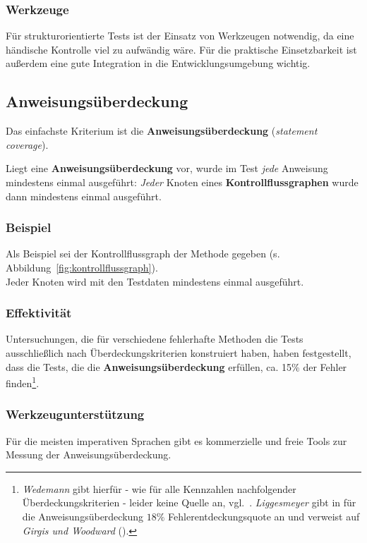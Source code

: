 \subsubsection*{Werkzeuge}
Für strukturorientierte Tests ist der Einsatz von Werkzeugen notwendig, da eine händische Kontrolle viel zu aufwändig wäre.
Für die praktische Einsetzbarkeit ist außerdem eine gute Integration in die Entwicklungsumgebung wichtig.

\subsection{Anweisungsüberdeckung}
Das einfachste Kriterium ist die \textbf{Anweisungsüberdeckung} (\textit{statement coverage}).

\begin{tcolorbox}[title=Anweisungsüberdeckung]
    Liegt eine \textbf{Anweisungsüberdeckung} vor, wurde im Test \textit{jede} Anweisung mindestens einmal ausgeführt: \textit{Jeder} Knoten eines \textbf{Kontrollflussgraphen} wurde dann mindestens einmal ausgeführt.
\end{tcolorbox}

\subsubsection*{Beispiel}
Als Beispiel sei der Kontrollflussgraph der Methode  gegeben (s. Abbildung~\ref{fig:kontrollflussgraph}).\\
Jeder Knoten wird mit den Testdaten  mindestens einmal ausgeführt.

\subsubsection*{Effektivität}
Untersuchungen, die für verschiedene fehlerhafte Methoden die Tests ausschließlich nach Überdeckungskriterien konstruiert haben, haben festgestellt, dass die Tests, die die \textbf{Anweisungsüberdeckung} erfüllen, ca. 15\% der Fehler finden\footnote{
\textit{Wedemann} gibt hierfür - wie für alle Kennzahlen nachfolgender Überdeckungskriterien - leider keine Quelle an, vgl.~\cite[51]{Wed09c}. \textit{Liggesmeyer} gibt in \cite[88]{Lig09a} für die Anweisungsüberdeckung $18\%$ Fehlerentdeckungsquote an und verweist auf \textit{Girgis und Woodward} (\cite{GW86}).
}.

\subsubsection*{Werkzeugunterstützung}
Für die meisten imperativen Sprachen gibt es kommerzielle und freie Tools zur Messung der Anweisungsüberdeckung.

